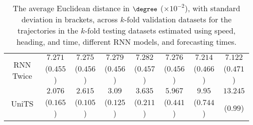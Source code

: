 \begin{table}[!ht]
{\begin{tabular}{|c|c|c|c|c|c|c|c|}
			\multirow{2}{*}{RNN Twice} & $7.271$ & $7.275$ & $7.279$ & $7.282$ & $7.276$ & $7.214$ & $7.122$ \\
			 & ($0.455$) & ($0.456$) & ($0.456$) & ($0.457$) & ($0.456$) & ($0.466$) & ($0.471$) \\ \hline
			\multirow{2}{*}{UniTS} & $2.076$ & $2.615$ & $3.09$ & $3.635$ & $5.967$ & $9.95$ & $13.245$ \\
			 & ($0.165$) & ($0.105$) & ($0.125$) & ($0.211$) & ($0.441$) & ($0.744$) & ($0.99$) \\ \hline
		\end{tabular}
	}
	\caption{The average Euclidean distance in $\degree$ ($\times 10^{-2}$), with standard deviation in brackets, across $k$-fold validation datasets for the trajectories in the $k$-fold testing datasets estimated using speed, heading, and time, different RNN models, and forecasting times.}
	\label{tab:all_speed_actual_dir_euclid}
\end{table}

